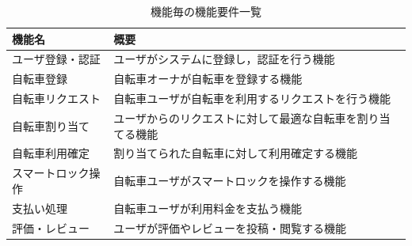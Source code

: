           
      \begin{table}[htbp]
        \caption{機能毎の機能要件一覧}
        \label{tab:機能毎の機能要件一覧}
        \centering
        \begin{tabular}{|l|p{4cm}|} \hline
          機能名 & 概要 \\ \hline
          ユーザ登録・認証 & ユーザがシステムに登録し，認証を行う機能 \\ \hline
          自転車登録 & 自転車オーナが自転車を登録する機能 \\ \hline
          自転車リクエスト & 自転車ユーザが自転車を利用するリクエストを行う機能 \\ \hline
          自転車割り当て & ユーザからのリクエストに対して最適な自転車を割り当てる機能 \\ \hline
          自転車利用確定 & 割り当てられた自転車に対して利用確定する機能 \\ \hline
          スマートロック操作 & 自転車ユーザがスマートロックを操作する機能 \\ \hline
          支払い処理 & 自転車ユーザが利用料金を支払う機能 \\ \hline
          評価・レビュー & ユーザが評価やレビューを投稿・閲覧する機能 \\ \hline
        \end{tabular}
      \end{table}


